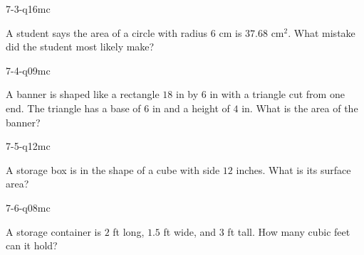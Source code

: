 \begin{practiceQuestion}{7-3-q16}{mc}
\begin{questionText}
A student says the area of a circle with radius $6$ cm is $37.68$ cm$^2$. What mistake did the student most likely make?
\end{questionText}
\end{practiceQuestion}

\begin{practiceQuestion}{7-4-q09}{mc}
\begin{questionText}
A banner is shaped like a rectangle $18$ in by $6$ in with a triangle cut from one end. The triangle has a base of $6$ in and a height of $4$ in. What is the area of the banner?
\end{questionText}
\end{practiceQuestion}

\begin{practiceQuestion}{7-5-q12}{mc}
\begin{questionText}
A storage box is in the shape of a cube with side $12$ inches. What is its surface area?
\end{questionText}
\end{practiceQuestion}

\begin{practiceQuestion}{7-6-q08}{mc}
\begin{questionText}
A storage container is $2$ ft long, $1.5$ ft wide, and $3$ ft tall. How many cubic feet can it hold?
\end{questionText}
\end{practiceQuestion}

